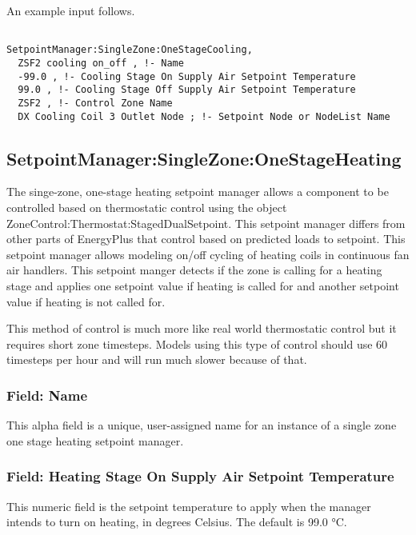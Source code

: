 An example input follows.

\begin{lstlisting}

SetpointManager:SingleZone:OneStageCooling,
  ZSF2 cooling on_off , !- Name
  -99.0 , !- Cooling Stage On Supply Air Setpoint Temperature
  99.0 , !- Cooling Stage Off Supply Air Setpoint Temperature
  ZSF2 , !- Control Zone Name
  DX Cooling Coil 3 Outlet Node ; !- Setpoint Node or NodeList Name
\end{lstlisting}

\subsection{SetpointManager:SingleZone:OneStageHeating}\label{setpointmanagersinglezoneonestageheating}

The singe-zone, one-stage heating setpoint manager allows a component to be controlled based on thermostatic control using the object ZoneControl:Thermostat:StagedDualSetpoint. This setpoint manager differs from other parts of EnergyPlus that control based on predicted loads to setpoint. This setpoint manager allows modeling on/off cycling of heating coils in continuous fan air handlers. This setpoint manger detects if the zone is calling for a heating stage and applies one setpoint value if heating is called for and another setpoint value if heating is not called for.

This method of control is much more like real world thermostatic control but it requires short zone timesteps. Models using this type of control should use 60 timesteps per hour and will run much slower because of that.

\subsubsection{Field: Name}\label{field-name-26-001}

This alpha field is a unique, user-assigned name for an instance of a single zone one stage heating setpoint manager.

\subsubsection{Field: Heating Stage On Supply Air Setpoint Temperature}\label{field-heating-stage-on-supply-air-setpoint-temperature}

This numeric field is the setpoint temperature to apply when the manager intends to turn on heating, in degrees Celsius. The default is 99.0 °C.

